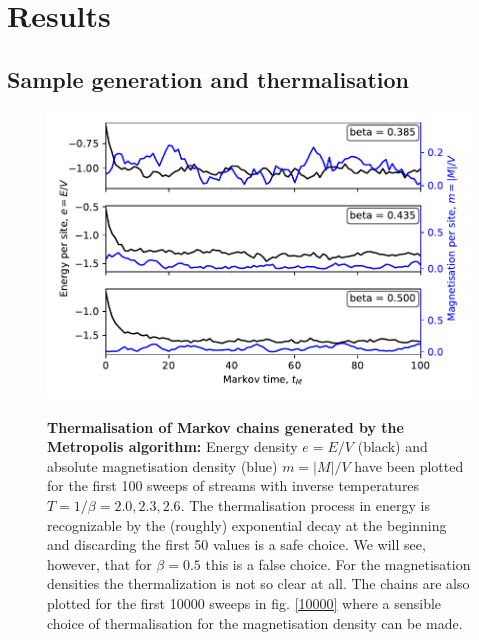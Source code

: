 \documentclass[11pt, a4paper]{scrartcl}
\begin{document}
\section{Results}
\subsection{Sample generation and thermalisation}
\begin{figure}
    \includegraphics{chains_therm.pdf}
    \label{therm}
    \caption{\textbf{Thermalisation of Markov chains generated by the Metropolis algorithm:} Energy density $e = E/V$ (black) and absolute magnetisation density (blue) $m = \left| M \right| / V$ have been plotted for the first 100 sweeps of streams with inverse temperatures $T = 1 / \beta = 2.0, 2.3, 2.6$. The thermalisation process in energy is recognizable by the (roughly) exponential decay at the beginning and discarding the first 50 values is a safe choice. We will see, however, that for $\beta = 0.5$ this is a false choice. For the magnetisation densities the thermalization is not so clear at all. The chains are also plotted for the first 10000 sweeps in fig. \ref{10000} where a sensible choice of thermalisation for the magnetisation density can be made.}
\end{figure}
\end{document}

